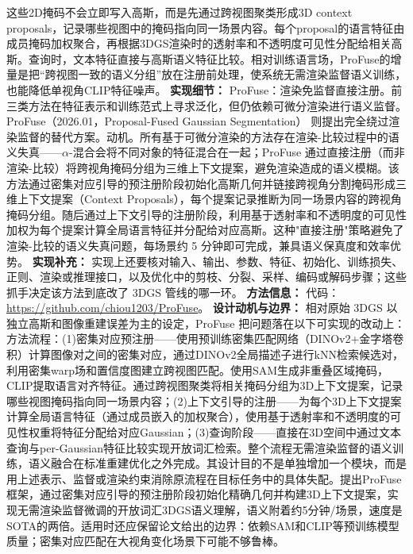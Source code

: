 这些2D掩码不会立即写入高斯，而是先通过跨视图聚类形成3D context proposals，记录哪些视图中的掩码指向同一场景内容。每个proposal的语言特征由成员掩码加权聚合，再根据3DGS渲染时的透射率和不透明度可见性分配给相关高斯。查询时，文本特征直接与高斯语义特征比较。相对训练语言场，ProFuse的增量是把“跨视图一致的语义分组”放在注册前处理，使系统无需渲染监督语义训练，也能降低单视角CLIP特征噪声。
\textbf{实现细节：} ProFuse：渲染免监督直接注册。前三类方法在特征表示和训练范式上寻求泛化，但仍依赖可微分渲染进行语义监督。ProFuse（2026.01，Proposal-Fused Gaussian Segmentation） 则提出完全绕过渲染监督的替代方案。动机。所有基于可微分渲染的方法存在渲染-比较过程中的语义失真——$\alpha$-混合会将不同对象的特征混合在一起；ProFuse 通过直接注册（而非渲染-比较）将跨视角掩码分组为三维上下文提案，避免渲染造成的语义模糊。该方法通过密集对应引导的预注册阶段初始化高斯几何并链接跨视角分割掩码形成三维上下文提案（Context Proposals），每个提案记录推断为同一场景内容的跨视角掩码分组。随后通过上下文引导的注册阶段，利用基于透射率和不透明度的可见性加权为每个提案计算全局语言特征并分配给对应高斯。这种"直接注册"策略避免了渲染-比较的语义失真问题，每场景约 5 分钟即可完成，兼具语义保真度和效率优势。
\textbf{实现补充：} 实现上还要核对输入、输出、参数、特征、初始化、训练损失、正则、渲染或推理接口，以及优化中的剪枝、分裂、采样、编码或解码步骤；这些抓手决定该方法到底改了 3DGS 管线的哪一环。
\textbf{方法信息：} 代码：\url{https://github.com/chiou1203/ProFuse}。
\textbf{设计动机与边界：} 相对原始 3DGS 以独立高斯和图像重建误差为主的设定，ProFuse 把问题落在以下可实现的改动上：方法流程：(1)密集对应预注册——使用预训练密集匹配网络（DINOv2+金字塔卷积）计算图像对之间的密集对应，通过DINOv2全局描述子进行kNN检索候选对，利用密集warp场和置信度图建立跨视图匹配。使用SAM生成非重叠区域掩码，CLIP提取语言对齐特征。通过跨视图聚类将相关掩码分组为3D上下文提案，记录哪些视图掩码指向同一场景内容；(2)上下文引导的注册——为每个3D上下文提案计算全局语言特征（通过成员嵌入的加权聚合），使用基于透射率和不透明度的可见性权重将特征分配给对应Gaussian；(3)查询阶段——直接在3D空间中通过文本查询与per-Gaussian特征比较实现开放词汇检索。整个流程无需渲染监督的语义训练，语义融合在标准重建优化之外完成。其设计目的不是单独增加一个模块，而是用上述表示、监督或渲染约束消除原流程在目标任务中的具体失配。提出ProFuse框架，通过密集对应引导的预注册阶段初始化精确几何并构建3D上下文提案，实现无需渲染监督微调的开放词汇3DGS语义理解，语义附着约5分钟/场景，速度是SOTA的两倍。适用时还应保留论文给出的边界：依赖SAM和CLIP等预训练模型质量；密集对应匹配在大视角变化场景下可能不够鲁棒。
